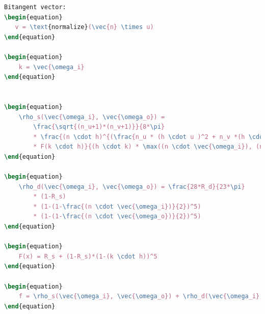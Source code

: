 \begin{codigo}[H]
\begin{lstlisting}[language=tex, frame=none, inputencoding=utf8]
Bitangent vector:
\begin{equation}
   v = \text{normalize}(\vec{n} \times u)
\end{equation}

\begin{equation}
    k = \vec{\omega_i}
\end{equation}


\begin{equation}
    \rho_s(\vec{\omega_i}, \vec{\omega_o}) =
        \frac{\sqrt{(n_u+1)*(n_v+1)}}{8*\pi}
        * \frac{(n \cdot h)^{(\frac{n_u * (h \cdot u )^2 + n_v *(h \cdot v)^2}{1-(h \cdot n)^2})}
        * F(k \cdot h)}{(h \cdot k) * \max((n \cdot \vec{\omega_i}), (n \cdot \vec{\omega_o}) )}
\end{equation}

\begin{equation}
    \rho_d(\vec{\omega_i}, \vec{\omega_o}) = \frac{28*R_d}{23*\pi}
        * (1-R_s)
        * (1-(1-\frac{(n \cdot \vec{\omega_i})}{2})^5)
        * (1-(1-\frac{(n \cdot \vec{\omega_o})}{2})^5)
\end{equation}

\begin{equation}
    F(x) = R_s + (1-R_s)*(1-(k \cdot h))^5
\end{equation}

\begin{equation}
    f = \rho_s(\vec{\omega_i}, \vec{\omega_o}) + \rho_d(\vec{\omega_i}, \vec{\omega_o})
\end{equation}

\end{lstlisting}
\end{codigo}
